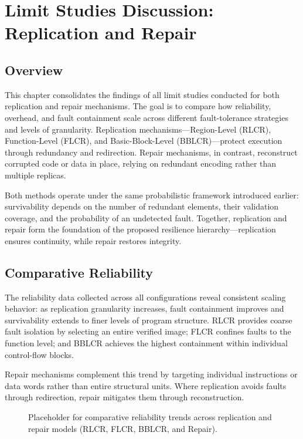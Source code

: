 \chapter{Limit Studies Discussion: Replication and Repair}
\label{chap:limit-discussion}

\section*{Overview}
This chapter consolidates the findings of all limit studies conducted for both
replication and repair mechanisms.  
The goal is to compare how reliability, overhead, and fault containment scale
across different fault-tolerance strategies and levels of granularity.
Replication mechanisms—Region-Level (RLCR), Function-Level (FLCR), and
Basic-Block-Level (BBLCR)—protect execution through redundancy and redirection.
Repair mechanisms, in contrast, reconstruct corrupted code or data in place,
relying on redundant encoding rather than multiple replicas.

Both methods operate under the same probabilistic framework introduced earlier:
survivability depends on the number of redundant elements, their validation
coverage, and the probability of an undetected fault.  
Together, replication and repair form the foundation of the proposed resilience
hierarchy—replication ensures continuity, while repair restores integrity.

\section*{Comparative Reliability}
The reliability data collected across all configurations reveal consistent
scaling behavior: as replication granularity increases, fault containment
improves and survivability extends to finer levels of program structure.
RLCR provides coarse fault isolation by selecting an entire verified image;
FLCR confines faults to the function level; and BBLCR achieves the highest
containment within individual control-flow blocks.

Repair mechanisms complement this trend by targeting individual instructions or
data words rather than entire structural units.  
Where replication avoids faults through redirection, repair mitigates them
through reconstruction.

\begin{figure}[t]
  \centering
  \caption{Placeholder for comparative reliability trends across replication and
           repair models (RLCR, FLCR, BBLCR, and Repair).}
  \label{fig:limit-reliability}
\end{figure}

